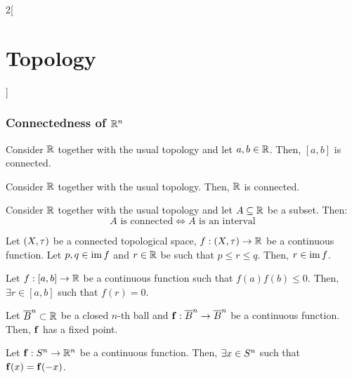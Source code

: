 \documentclass[../../../main_math.tex]{subfiles}
\begin{document}
\begin{multicols}{2}[\section{Topology}]
  \subsubsection{Connectedness of \texorpdfstring{$\RR^n$}{Rn}}
  \begin{theorem}
    Consider $\RR$ together with the usual topology and let $a,b\in\RR$. Then, $[a,b]$ is connected.
  \end{theorem}
  \begin{theorem}
    Consider $\RR$ together with the usual topology. Then, $\RR$ is connected.
  \end{theorem}
  \begin{theorem}
    Consider $\RR$ together with the usual topology and let $A\subseteq \RR$ be a subset. Then: $$A\text{ is connected}\iff A\text{ is an interval}$$
  \end{theorem}
  \begin{theorem}
    Let $(X,\topo)$ be a connected topological space, $f:(X,\topo)\rightarrow\RR$ be a continuous function. Let $p,q\in \im f$ and $r\in \RR$ be such that $p\leq r\leq q$. Then, $r\in \im f$.
  \end{theorem}
  \begin{corollary}
    Let $f:[a,b]\rightarrow\RR$ be a continuous function such that $f(a)f(b)\leq 0$. Then, $\exists r\in [a,b]$ such that $f(r)=0$.
  \end{corollary}
  \begin{theorem}
    Let $\overline{B}^n\subset\RR$ be a closed $n$-th ball and $\vf{f}:\overline{B}^n\rightarrow\overline{B}^n$ be a continuous function. Then, $\vf{f}$ has a fixed point.
  \end{theorem}
  \begin{theorem}
    Let $\vf{f}:\S^n\rightarrow\RR^n$ be a continuous function. Then, $\exists x\in \S^n$ such that $\vf{f}(x)=\vf{f}(-x)$.
  \end{theorem}

\end{multicols}
\end{document}
